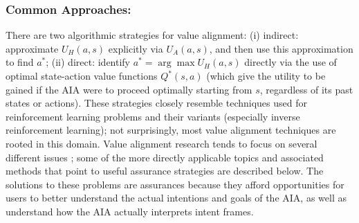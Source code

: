 \subsubsection{Common Approaches:}
There are two algorithmic strategies for value alignment: (i) indirect: approximate $U_H(a,s)$ explicitly via $U_A(a,s)$, and then use this approximation to find $a^*$; (ii) direct: identify $a^* = \arg \max U_H(a,s)$ directly via the use of optimal state-action value functions $Q^*(s,a)$ (which give the utility to be gained if the AIA were to proceed optimally starting from $s$, regardless of its past states or actions). 
These strategies closely resemble techniques used for reinforcement learning problems and their variants (especially inverse reinforcement learning); not surprisingly, most value alignment techniques are rooted in this domain. 
Value alignment research tends to focus on several different issues \cite{Gordon_Worley2018-xy,Amodei2016-xi}; some of the more directly applicable topics and associated methods that point to useful assurance strategies are described below. 
%
The solutions to these problems are assurances because they afford opportunities for  users to better understand the actual intentions and goals of the AIA, as well as understand how the AIA actually interprets intent frames. 


